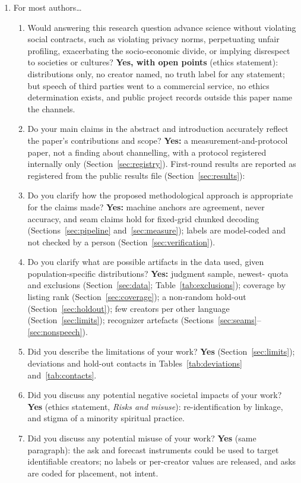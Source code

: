 {\small
\begin{enumerate}
\item For most authors\ldots
\begin{enumerate}
\item Would answering this research question advance science without violating social contracts, such as violating privacy norms, perpetuating unfair profiling, exacerbating the socio-economic divide, or implying disrespect to societies or cultures? \textbf{Yes, with open points} (ethics statement): distributions only, no creator named, no truth label for any statement; but speech of third parties went to a commercial service, no ethics determination exists, and public project records outside this paper name the channels.
\item Do your main claims in the abstract and introduction accurately reflect the paper's contributions and scope? \textbf{Yes:} a measurement-and-protocol paper, not a finding about channelling, with a protocol registered internally only (Section~\ref{sec:registry}). First-round results are reported as registered from the public results file (Section~\ref{sec:results}): \ResSummary{} \ResCounts{}
\item Do you clarify how the proposed methodological approach is appropriate for the claims made? \textbf{Yes:} machine anchors are agreement, never accuracy, and seam claims hold for fixed-grid chunked decoding (Sections~\ref{sec:pipeline} and~\ref{sec:measure}); labels are model-coded and not checked by a person (Section~\ref{sec:verification}).
\item Do you clarify what are possible artifacts in the data used, given population-specific distributions? \textbf{Yes:} judgment sample, newest-\NPerCreator{} quota and exclusions (Section~\ref{sec:data}; Table~\ref{tab:exclusions}); coverage by listing rank (Section~\ref{sec:coverage}); a non-random hold-out (Section~\ref{sec:holdout}); few creators per other language (Section~\ref{sec:limits}); recognizer artefacts (Sections~\ref{sec:seams}--\ref{sec:nonspeech}).
\item Did you describe the limitations of your work? \textbf{Yes} (Section~\ref{sec:limits}); deviations and hold-out contacts in Tables~\ref{tab:deviations} and~\ref{tab:contacts}.
\item Did you discuss any potential negative societal impacts of your work? \textbf{Yes} (ethics statement, \emph{Risks and misuse}): re-identification by linkage, and stigma of a minority spiritual practice.
\item Did you discuss any potential misuse of your work? \textbf{Yes} (same paragraph): the ask and forecast instruments could be used to target identifiable creators; no labels or per-creator values are released, and asks are coded for placement, not intent.

\end{enumerate}
\end{enumerate}}
